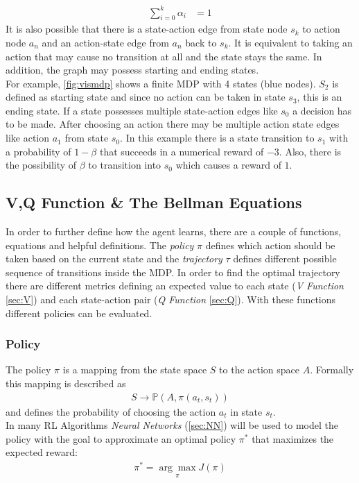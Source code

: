 \begin{align}
	\sum_{i=0}^{k} \alpha_i &= 1
\end{align}
\newline
It is also possible that there is a state-action edge from state node $s_k$ to action node $a_n$ and an action-state edge from $a_n$ back to $s_k$. 
It is equivalent to taking an action that may cause no transition at all and the state stays the same. In addition, the graph may possess starting and ending states.\\
For example, \cref{fig:vismdp} shows a finite MDP with 4 states (blue nodes). 
$S_2$ is defined as starting state and since no action can be taken in state $s_3$, this is an ending state. 
If a state possesses multiple state-action edges like $s_0$ a decision has to be made. 
After choosing an action there may be multiple action state edges like action $a_1$ from state $s_0$. 
In this example there is a state transition to $s_1$ with a probability of $1-\beta$ that succeeds in a numerical reward of $-3$. 
Also, there is the possibility of $\beta$ to transition into $s_0$ which causes a reward of $1$.

\newpage

\subsection{V,Q Function \& The Bellman Equations}
In order to further define how the agent learns, there are a couple of functions, equations and helpful definitions. 
The \emph{policy} $\pi$ defines which action should be taken based on the current state and the \emph{trajectory} $\tau$ 
defines different possible sequence of transitions inside the MDP. 
In order to find the optimal trajectory there are different metrics defining an expected value to each state (\emph{V Function} \cref{sec:V}) and each state-action pair (\emph{Q Function} \cref{sec:Q}). 
With these functions different policies can be evaluated. 

\subsubsection{Policy}
The policy $\pi$ is a mapping from the state space $S$ to the action space $A$. Formally this mapping is described as
\begin{align*}
	S \to \mathbb{P}(A, \pi (a_t,s_t))
\end{align*}
\newline
and defines the probability of choosing the action $a_t$ in state $s_t$.\\
In many RL Algorithms \emph{Neural Networks} (\cref{sec:NN}) will be used to model the policy with 
the goal to approximate an optimal policy $\pi^*$ that maximizes the expected reward:
\begin{align*}
	\pi^* = \underset{\pi} {\arg \max} J(\pi)
\end{align*}

